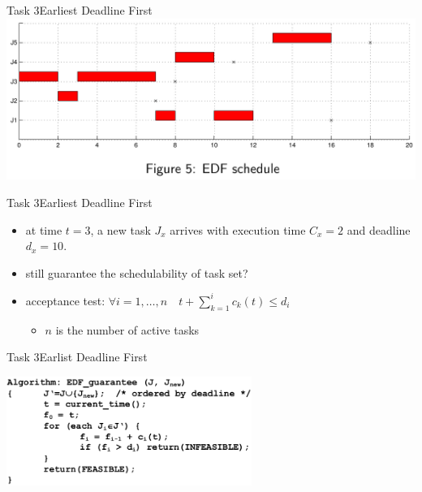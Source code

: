 \begin{frame}{Task 3}{Earliest Deadline First}
  \includegraphics[width=\textwidth]{./figures/3_sol.png}
\end{frame}

\begin{frame}{Task 3}{Earliest Deadline First}
  \begin{tasknoinc}
    \begin{itemize}
      \item at time $t = 3$, a new task $J_x$ arrives with execution time $C_x = 2$ and deadline $d_x = 10$.
      \item still \alert{guarantee the schedulability} of task set?
    \end{itemize}
  \end{tasknoinc}
  \begin{requirements}
    \begin{itemize}
      \item \alert{acceptance test:} $\displaystyle \forall i=1, \ldots, n \quad t+\sum_{k=1}^i c_k(t) \leq d_i$
        \begin{itemize}
          \item $n$ is the number of \alert{active tasks}
        \end{itemize}
    \end{itemize}
  \end{requirements}
\end{frame}

\begin{frame}{Task 3}{Earlist Deadline First}
  \begin{requirementsnoinc}
    \centering
    \includegraphics[width=0.6\textwidth]{./figures/3_2_algorith_edf_guarentee.png}
  \end{requirementsnoinc}
\end{frame}

